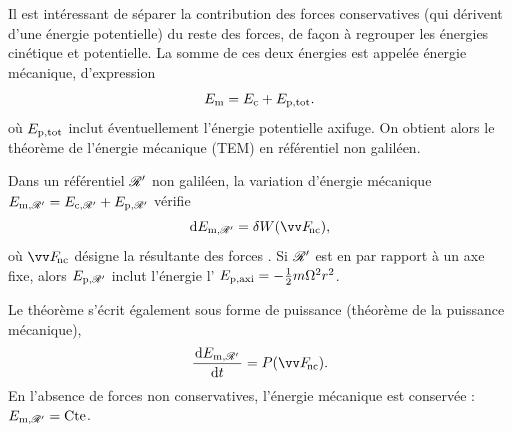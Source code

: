 \documentclass[12pt,fancy]{cours}
\begin{document}
Il est intéressant de séparer la contribution des forces conservatives (qui dérivent d'une énergie potentielle) du reste des forces, de façon à regrouper les énergies cinétique et potentielle. La somme de ces deux énergies est appelée énergie mécanique, d'expression
\begin{equation}
E_{\rm{m}} = E_{\rm{c}} + E_{\rm p,tot}.
\end{equation}
où $E_{\rm p,tot}$ inclut éventuellement l'énergie potentielle axifuge.
 On obtient alors le théorème de l'énergie mécanique (TEM) en référentiel non galiléen.
 \begin{theorem}\label{form:TEM}
Dans un référentiel $\mathcal{R}'$ non galiléen, la variation d'énergie mécanique $E_{\rm m, \mathcal{R}'} = E_{\rm{c},\mathcal{R}'} + E_{\rm p,\mathcal{R}'}$  vérifie
\begin{equation*}
\d E_{\rm m, \Rcal'} = \delta W(\F_{\rm \!nc}),
\end{equation*}
où $\F_{\rm \!nc}$ désigne la résultante des forces . Si $\mathcal{R}'$ est en  par rapport à un axe fixe, alors $E_{\rm p,\mathcal{R}'}$ inclut l'énergie l' $E_{\rm p, axi}=-\frac{1}{2}m\Omega^2 r^2$.
\end{theorem}

\noindent Le théorème s'écrit également sous forme de puissance (théorème de la puissance mécanique),
  \begin{equation}
 \frac{\left.\d E_{\rm{m},\Rcal'}\right.}{\d t}=P(\F_{\rm \!nc}).
\end{equation}
En l'absence de forces non conservatives, l'énergie mécanique est conservée : $E_{\rm m,\mathcal{R}'} = \text{Cte}$.
\end{document}
